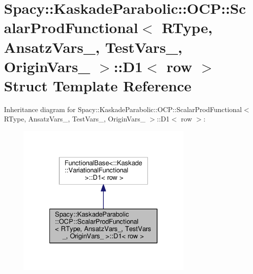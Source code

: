\hypertarget{structSpacy_1_1KaskadeParabolic_1_1OCP_1_1ScalarProdFunctional_1_1D1}{\section{Spacy\-:\-:Kaskade\-Parabolic\-:\-:O\-C\-P\-:\-:Scalar\-Prod\-Functional$<$ R\-Type, Ansatz\-Vars\-\_\-, Test\-Vars\-\_\-, Origin\-Vars\-\_\- $>$\-:\-:D1$<$ row $>$ Struct Template Reference}
\label{structSpacy_1_1KaskadeParabolic_1_1OCP_1_1ScalarProdFunctional_1_1D1}
}


Inheritance diagram for Spacy\-:\-:Kaskade\-Parabolic\-:\-:O\-C\-P\-:\-:Scalar\-Prod\-Functional$<$ R\-Type, Ansatz\-Vars\-\_\-, Test\-Vars\-\_\-, Origin\-Vars\-\_\- $>$\-:\-:D1$<$ row $>$\-:
\nopagebreak
\begin{figure}[H]
\begin{center}
\leavevmode
\includegraphics[width=242pt]{structSpacy_1_1KaskadeParabolic_1_1OCP_1_1ScalarProdFunctional_1_1D1__inherit__graph}
\end{center}
\end{figure}


